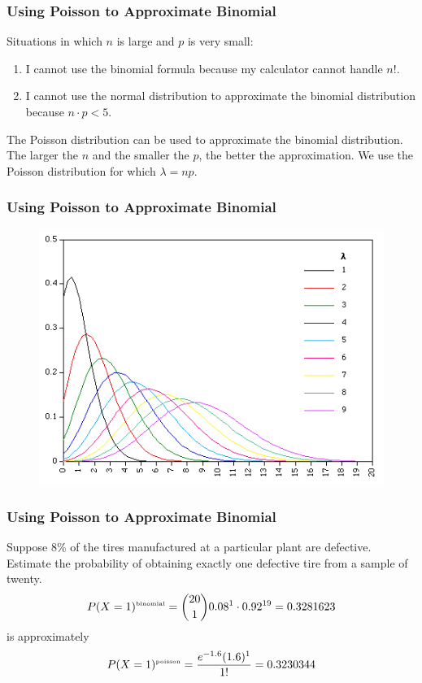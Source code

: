 \documentclass[xcolor=dvipsnames]{beamer}
\begin{document}
\begin{frame}
  \frametitle{Using Poisson to Approximate Binomial}
  Situations in which $n$ is large and $p$ is very small:
  \begin{enumerate}
  \item I cannot use the binomial formula because my calculator cannot
    handle $n!$.
  \item I cannot use the normal distribution to approximate the
    binomial distribution because $n\cdot{}p<5$.
  \end{enumerate}
  The Poisson distribution can be used to approximate the binomial
  distribution. The larger the $n$ and the smaller the $p$, the better
  the approximation. We use the Poisson distribution for which
  $\lambda=np$.
\end{frame}

\begin{frame}
  \frametitle{Using Poisson to Approximate Binomial}
    \begin{figure}[h]
    \includegraphics[scale=.62]{./diagrams/poisdist.png}
  \end{figure}
\end{frame}

\begin{frame}
  \frametitle{Using Poisson to Approximate Binomial}
   Suppose 8\% of the tires manufactured
  at a particular plant are defective. Estimate the probability of obtaining
  exactly one defective tire from a sample of twenty.
  \begin{equation}
    \label{eq:eikaiche}
    P(X=1)^{\mbox{\tiny binomial}}={20\choose{}1}0.08^{1}\cdot0.92^{19}=0.3281623
  \end{equation}
  is approximately
  \begin{equation}
    \label{eq:aihuroot}
    P(X=1)^{\mbox{\tiny poisson}}=\frac{e^{-1.6}(1.6)^{1}}{1!}=0.3230344
  \end{equation}
\end{frame}
\end{document}
